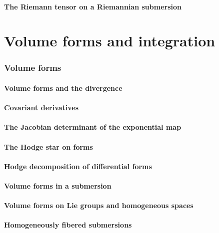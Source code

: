 \documentclass[a4paper]{article}
\begin{document}
\subsection{The Riemann tensor on a Riemannian submersion}

\part{Volume forms and integration}

\section{Volume forms}

\subsection{Volume forms and the divergence}

\subsection{Covariant derivatives}

\subsection{The Jacobian determinant of the exponential map}

\subsection{The Hodge star on forms}

\subsection{Hodge decomposition of differential forms}

\subsection{Volume forms in a submersion}

\subsection{Volume forms on Lie groups and homogeneous spaces}

\subsection{Homogeneously fibered submersions}
\end{document}
